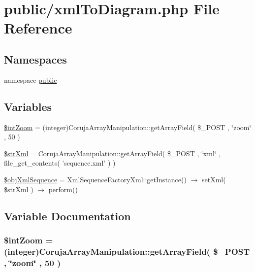 \hypertarget{xml_to_diagram_8php}{
\section{public/xmlToDiagram.php File Reference}
\label{xml_to_diagram_8php}
}
\subsection*{Namespaces}
\begin{CompactItemize}
\item 
namespace \hyperlink{namespacepublic}{public}
\end{CompactItemize}
\subsection*{Variables}
\begin{CompactItemize}
\item 
\hyperlink{xml_to_diagram_8php_ba837fb08baf5fbca04d8237a589e93e}{\$intZoom} = (integer)CorujaArrayManipulation::getArrayField( \$\_\-POST , \char`\"{}zoom\char`\"{} , 50 )
\item 
\hyperlink{xml_to_diagram_8php_2651e3074f6303e4683f2aff16ec1fbd}{\$strXml} = CorujaArrayManipulation::getArrayField( \$\_\-POST , \char`\"{}xml\char`\"{} , file\_\-get\_\-contents( 'sequence.xml' ) )
\item 
\hyperlink{xml_to_diagram_8php_eefa469c1b13fe1fec040c910b720034}{\$objXmlSequence} = XmlSequenceFactoryXml::getInstance() $\rightarrow$ setXml( \$strXml ) $\rightarrow$ perform()
\end{CompactItemize}


\subsection{Variable Documentation}
\hypertarget{xml_to_diagram_8php_ba837fb08baf5fbca04d8237a589e93e}{
\subsubsection[{\$intZoom}]{\setlength{\rightskip}{0pt plus 5cm}\$intZoom = (integer)CorujaArrayManipulation::getArrayField( \$\_\-POST , \char`\"{}zoom\char`\"{} , 50 )}}
\label{xml_to_diagram_8php_ba837fb08baf5fbca04d8237a589e93e}


